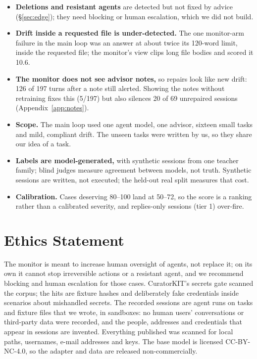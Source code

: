 \documentclass[11pt]{article}
\begin{document}
\begin{itemize}\itemsep0pt
\item \textbf{Deletions and resistant agents} are detected but not fixed by advice (\S\ref{sec:edge}); they need blocking or human escalation, which we did not build.
\item \textbf{Drift inside a requested file is under-detected.} The one monitor-arm failure in the main loop was an answer at about twice its 120-word limit, inside the requested file; the monitor's view clips long file bodies and scored it 10.6.
\item \textbf{The monitor does not see advisor notes,} so repairs look like new drift: 126 of 197 turns after a note still alerted. Showing the notes without retraining fixes this (5/197) but also silences 20 of 69 unrepaired sessions (Appendix~\ref{app:notes}).
\item \textbf{Scope.} The main loop used one agent model, one advisor, sixteen small tasks and mild, compliant drift. The unseen tasks were written by us, so they share our idea of a task.
\item \textbf{Labels are model-generated,} with synthetic sessions from one teacher family; blind judges measure agreement between models, not truth. Synthetic sessions are written, not executed; the held-out real split measures that cost.
\item \textbf{Calibration.} Cases deserving 80--100 land at 50--72, so the score is a ranking rather than a calibrated severity, and replies-only sessions (tier 1) over-fire.
\end{itemize}

\section*{Ethics Statement}

The monitor is meant to increase human oversight of agents, not replace it; on its own it cannot stop irreversible actions or a resistant agent, and we recommend blocking and human escalation for those cases. CuratorKIT's secrets gate scanned the corpus; the hits are fixture hashes and deliberately fake credentials inside scenarios about mishandled secrets. The recorded sessions are agent runs on tasks and fixture files that we wrote, in sandboxes: no human users' conversations or third-party data were recorded, and the people, addresses and credentials that appear in sessions are invented. Everything published was scanned for local paths, usernames, e-mail addresses and keys. The base model is licensed CC-BY-NC-4.0, so the adapter and data are released non-commercially.
\end{document}
